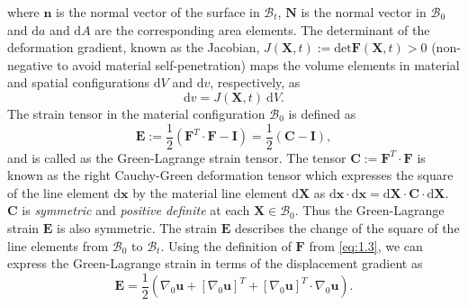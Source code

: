 where $\mathbf{n}$ is the normal vector of the surface in $\mathcal{B}_t$, $\mathbf{N}$ is the normal vector in $\mathcal{B}_0$ and $\mathrm{d}a$ and $\mathrm{d}A$ are the corresponding area elements. The determinant of the deformation gradient, known as the Jacobian, $J(\mathbf{X}, t) := \text{det} \mathbf{F}(\mathbf{X}, t) > 0$ (non-negative to avoid material self-penetration) maps the volume elements in material and spatial configurations $\mathrm{d}V$ and $\mathrm{d}v$, respectively, as 
\begin{equation}
\mathrm{d}v = J(\mathbf{X}, t) \ \mathrm{d}V.
\end{equation} 
The strain tensor in the material configuration $\mathcal{B}_0$ is defined as
\begin{equation}
\mathbf{E} := \frac{1}{2} (\mathbf{F}^T \cdot \mathbf{F} - \mathbf{I}) = \frac{1}{2} (\mathbf{C} - \mathbf{I}),
\end{equation}
and is called as the Green-Lagrange strain tensor. The tensor $\mathbf{C}:= \mathbf{F}^T \cdot \mathbf{F}$ is known as the right Cauchy-Green deformation tensor which expresses the square of the line element $\bm{\mathrm{d}}\mathbf{x}$ by the material line element $\bm{\mathrm{d}}\mathbf{X}$ as $\bm{\mathrm{d}}\mathbf{x} \cdot \bm{\mathrm{d}}\mathbf{x} = \bm{\mathrm{d}}\mathbf{X} \cdot \mathbf{C} \cdot \bm{\mathrm{d}}\mathbf{X}$. $\mathbf{C}$ is \textit{symmetric} and \textit{positive definite} at each $\mathbf{X} \in \mathcal{B}_0$. Thus the Green-Lagrange strain $\mathbf{E}$ is also symmetric. The strain $\mathbf{E}$ describes the change of the square of the line elements from $\mathcal{B}_0$ to $\mathcal{B}_t$. Using the definition of $\mathbf{F}$ from \eqref{eq:1.3}, we can express the Green-Lagrange strain in terms of the displacement gradient as 
\begin{equation}
\mathbf{E} = \frac{1}{2} ( \nabla_0 \mathbf{u} + [\nabla_0 \mathbf{u}]^T + [\nabla_0 \mathbf{u}]^T \cdot \nabla_0 \mathbf{u} ).
\end{equation}

